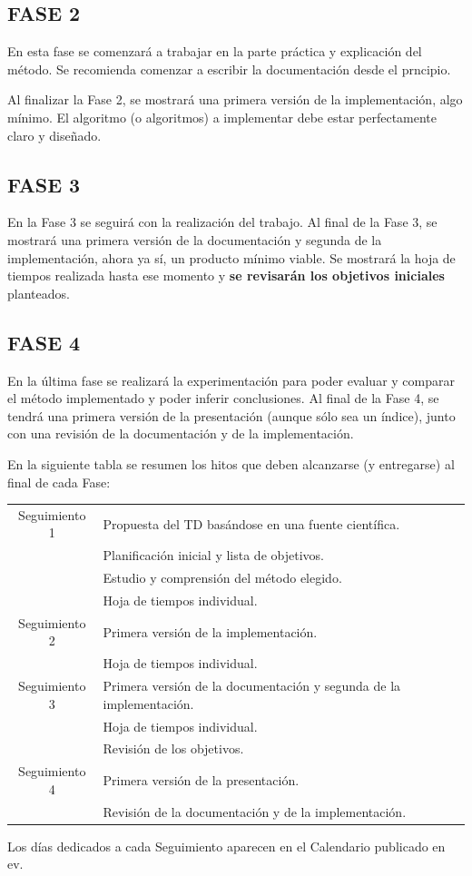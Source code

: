 \documentclass[a4paper]{article}
\begin{document}
\subsection*{FASE 2}
En esta fase se comenzará a trabajar en la parte práctica y explicación del método. Se recomienda comenzar a escribir la documentación desde el prncipio.

Al finalizar la Fase 2, se mostrará una primera versión de la implementación, algo mínimo. El algoritmo (o algoritmos) a implementar debe estar perfectamente claro y diseñado. 

\subsection*{FASE 3}
En la Fase 3 se seguirá con la realización del trabajo. Al final de la Fase 3, se mostrará una primera versión de la documentación y segunda de la implementación, ahora ya sí, un producto mínimo viable. Se mostrará la hoja de tiempos realizada hasta ese momento y \textbf{ se revisarán los objetivos iniciales} planteados.

\subsection*{FASE 4}
En la última fase se realizará la experimentación para poder evaluar y comparar el método implementado y poder inferir conclusiones. Al final de la Fase 4, se tendrá una primera versión de la presentación (aunque sólo sea un índice), junto con una revisión de la documentación y de la implementación. 

\vspace{1cm}
En la siguiente tabla se resumen los hitos que deben alcanzarse (y entregarse) al final de cada Fase: 

    \begin{center}
    \begin{tabular}{|c||l|}
    \hline
  Seguimiento 1 & Propuesta del TD basándose en una fuente científica.   \\& Planificación inicial y lista de objetivos. \\
  & Estudio y comprensión del método elegido. \\
  & Hoja de tiempos individual.\\
\hline
Seguimiento 2  & Primera versión de la implementación. \\ &  Hoja de tiempos individual.\\
\hline
 Seguimiento 3 & Primera versión de la documentación y segunda de la implementación.\\
&  Hoja de tiempos individual.\\& Revisión de los objetivos. \\
\hline
Seguimiento 4 & Primera versión de la presentación.  \\& Revisión de la documentación  y de la  implementación.\\
\hline
    \end{tabular}
    \end{center}
Los días dedicados a cada Seguimiento aparecen en el Calendario publicado en ev.
\end{document}
